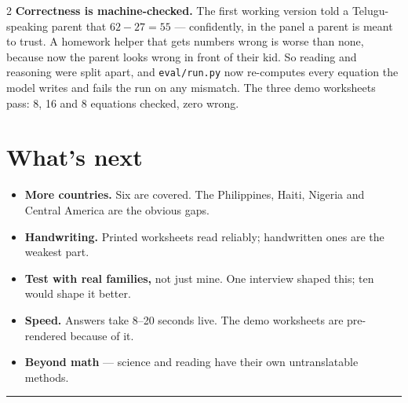 \documentclass[9pt,letterpaper]{extarticle}
\begin{document}
\begin{multicols}{2}
\textbf{Correctness is machine-checked.} The first working version told a Telugu-speaking parent that $62-27=55$ --- confidently, in the panel a parent is meant to trust. A homework helper that gets numbers wrong is worse than none, because now the parent looks wrong in front of their kid. So reading and reasoning were split apart, and \texttt{eval/run.py} now re-computes every equation the model writes and fails the run on any mismatch. The three demo worksheets pass: 8, 16 and 8 equations checked, zero wrong.

\section*{What's next}

\begin{itemize}[leftmargin=11pt,itemsep=1pt,topsep=2pt]
  \item \textbf{More countries.} Six are covered. The Philippines, Haiti, Nigeria and Central America are the obvious gaps.
  \item \textbf{Handwriting.} Printed worksheets read reliably; handwritten ones are the weakest part.
  \item \textbf{Test with real families,} not just mine. One interview shaped this; ten would shape it better.
  \item \textbf{Speed.} Answers take 8--20 seconds live. The demo worksheets are pre-rendered because of it.
  \item \textbf{Beyond math} --- science and reading have their own untranslatable methods.
\end{itemize}

\end{multicols}

\vspace{2pt}
{\color{rule}\rule{\textwidth}{0.5pt}}
\vspace{1pt}

\end{document}

